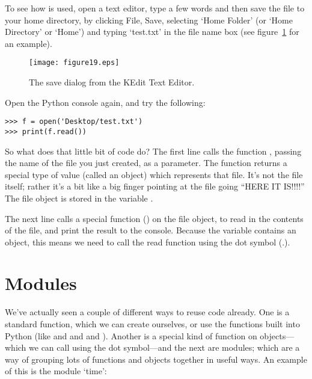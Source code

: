\begin{LINUX}
To see how  is used, open a text editor, type a few words and then save the file to your home directory, by clicking File, Save, selecting `Home Folder' (or `Home Directory' or `Home') and typing `test.txt' in the file name box (see figure~\ref{fig19} for an example).

\begin{figure}
\begin{center}
\texttt{[image: figure19.eps]}
\end{center}
\caption{The save dialog from the KEdit Text Editor.}\label{fig19}
\end{figure}

Open the Python console again, and try the following:

\begin{Verbatim}[frame=single]
>>> f = open('Desktop/test.txt')
>>> print(f.read())
\end{Verbatim}

\end{LINUX}

So what does that little bit of code do?  The first line calls the function , passing the name of the file you just created, as a parameter.  The function returns a special type of value (called an object) which represents that file.  It's not the file itself; rather it's a bit like a big finger pointing at the file going ``HERE IT IS!!!!''  The file object is stored in the variable .
\par
The next line calls a special function () on the file object, to read in the contents of the file, and print the result to the console.  Because the variable  contains an object, this means we need to call the read function using the dot symbol (.).


\section{Modules}

We've actually seen a couple of different ways to reuse code already. One is a standard function, which we can create ourselves, or use the functions built into Python (like  and  and  and ). Another is a special kind of function on objects---which we can call using the dot symbol---and the next are modules; which are a way of grouping lots of functions and objects together in useful ways. An example of this is the module `time':

